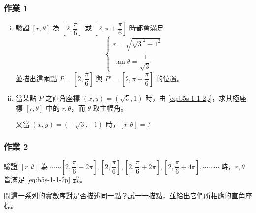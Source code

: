 \subsubsection*{作業 1}
\begin{enumerate}[(i)]
  \item 驗證 $[r, \theta]$ 為 $\left[2, \dfrac{\pi}{6}\right]$ 或 $\left[2, \pi + \dfrac{\pi}{6}\right]$ 時都會滿足
  \begin{equation}
  \begin{cases}
  r = \sqrt{\sqrt{3}^2 + 1^2} \\[4pt]
  \tan\theta = \dfrac{1}{\sqrt{3}}
  \end{cases} \tag{$2'$} \label{eq:b5s-1-1-2p}
  \end{equation}
  並描出這兩點 $P = \left[2, \dfrac{\pi}{6}\right]$ 與 $P' = \left[2, \pi + \dfrac{\pi}{6}\right]$ 的位置。
  \item 當某點 $P$ 之直角座標 $(x, y) = (\sqrt{3}, 1)$ 時，由 \eqref{eq:b5s-1-1-2p}，求其極座標 $[r, \theta]$ 中的 $r, \theta$，而 $\theta$ 取主幅角。

  又當 $(x, y) = (-\sqrt{3}, -1)$ 時，$[r, \theta] = ?$
\end{enumerate}

\subsubsection*{作業 2}
驗證 $[r, \theta]$ 為 $\cdots\cdots \left[2, \dfrac{\pi}{6} - 2\pi\right], \left[2, \dfrac{\pi}{6}\right], \left[2, \dfrac{\pi}{6} + 2\pi\right], \left[2, \dfrac{\pi}{6} + 4\pi\right], \cdots\cdots\cdots$ 時，$r, \theta$ 皆滿足 \eqref{eq:b5s-1-1-2p} 式。

問這一系列的實數序對是否描述同一點？試一一描點，並給出它們所相應的直角座標。


